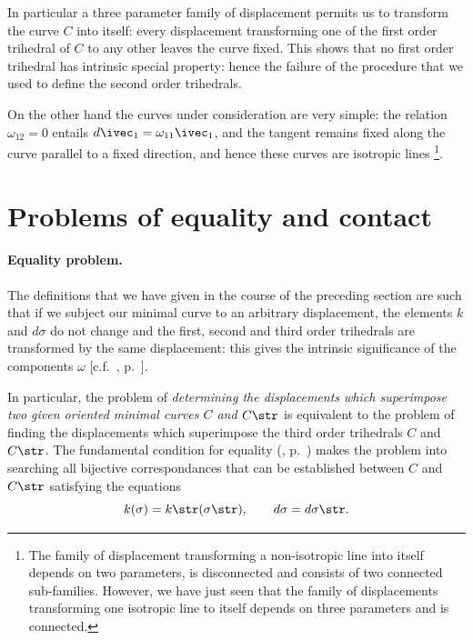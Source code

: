 In particular a three parameter family of displacement permits us to transform the curve $C$ into itself: every displacement transforming one of the first order trihedral of $C$ to any other leaves the curve fixed. This shows that no first order trihedral has intrinsic special property: hence the failure of the procedure that we used to define the second order trihedrals.

On the other hand the curves under consideration are very simple: the relation $\omega_{12}=0$ entails $d\ivec_{1}=\omega_{11}\ivec_{1}$, and the tangent remains fixed along the curve parallel to a fixed direction, and hence these curves are isotropic lines \footnote{The family of displacement transforming a non-isotropic line into itself depends on two parameters, is disconnected and consists of two connected sub-families. However, we have just seen that the family of displacements transforming one isotropic line to itself depends on three parameters and is connected.}.


\section{Problems of equality and contact}
\label{sec:probl-equal-cont}

\paragraph{Equality problem.}
\label{sec:31}
The definitions that we have given in the course of the preceding section are such that if we subject our minimal curve to an arbitrary displacement, the elements $k$ and $d\sigma$ do not change and the first, second and third order trihedrals are transformed by the same displacement: this gives the intrinsic significance of the components $\omega$ [c.f.~, p.~\pageref{sec:26}].

In particular, the problem of \emph{determining the displacements which superimpose two given oriented minimal curves $C$ and $C\str$} is equivalent to the problem of finding the displacements which superimpose the third order trihedrals $C$ and $C\str$. The fundamental condition for equality (, p.~\pageref{sec:26}) makes the problem into searching all bijective correspondances that can be established between $C$ and $C\str$ satisfying the equations
\begin{equation}
  \label{eq:2.21}
  k(\sigma)=k\str(\sigma\str),\qquad d\sigma=d\sigma\str.
\end{equation}

